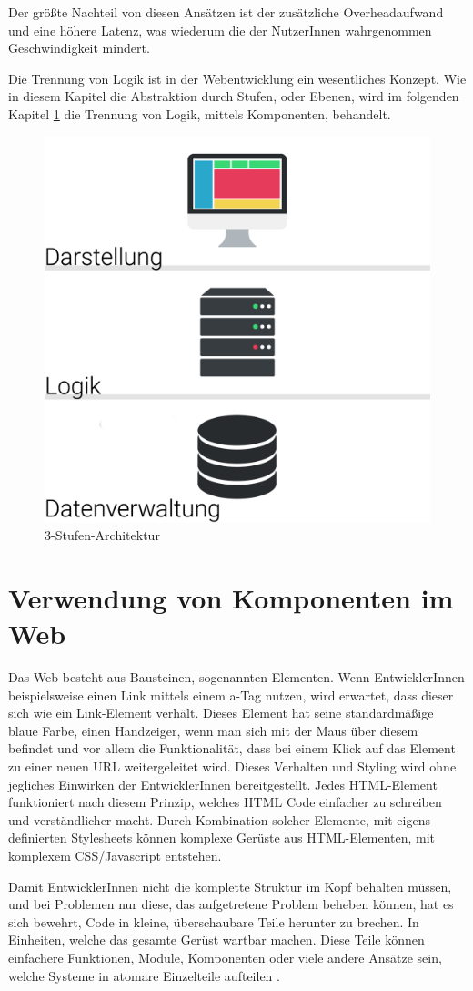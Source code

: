 Der größte Nachteil von diesen Ansätzen ist der zusätzliche Overheadaufwand und eine höhere Latenz, was wiederum die der NutzerInnen wahrgenommen Geschwindigkeit mindert.

Die Trennung von Logik ist in der Webentwicklung ein wesentliches Konzept. Wie in diesem Kapitel die Abstraktion durch Stufen, oder Ebenen, wird im folgenden Kapitel \ref{cha:component_usage} die Trennung von Logik, mittels Komponenten, behandelt.

\begin{figure}
	\centering
	\includegraphics[width=0.5\linewidth]{images/3-stufen-architektur}
	\caption{3-Stufen-Architektur}
	\label{fig:3-stufen-architektur}
\end{figure}

\section{Verwendung von Komponenten im Web}
\label{cha:component_usage}

Das Web besteht aus Bausteinen, sogenannten Elementen. Wenn EntwicklerInnen beispielsweise einen Link mittels einem a-Tag nutzen, wird erwartet, dass dieser sich wie ein Link-Element verhält. Dieses Element hat seine standardmäßige blaue Farbe, einen Handzeiger, wenn man sich mit der Maus über diesem befindet und vor allem die Funktionalität, dass bei einem Klick auf das Element zu einer neuen URL weitergeleitet wird. Dieses Verhalten und Styling wird ohne jegliches Einwirken der EntwicklerInnen bereitgestellt. Jedes HTML-Element funktioniert nach diesem Prinzip, welches HTML Code einfacher zu schreiben und verständlicher macht.
Durch Kombination solcher Elemente, mit eigens definierten Stylesheets können komplexe Gerüste aus HTML-Elementen, mit komplexem CSS/Javascript entstehen.

Damit EntwicklerInnen nicht die komplette Struktur im Kopf behalten müssen, und bei Problemen nur diese, das aufgetretene Problem beheben können, hat es sich bewehrt, Code in kleine, überschaubare Teile herunter zu brechen. In Einheiten, welche das gesamte Gerüst wartbar machen. Diese Teile können einfachere Funktionen, Module, Komponenten oder viele andere Ansätze sein, welche Systeme in atomare Einzelteile aufteilen \cite{components-benefit}.

